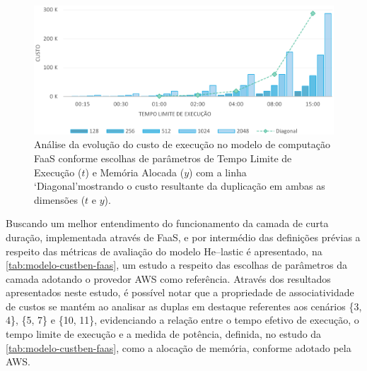 \documentclass[english,brazilian]{UNISINOSmonografia} %
\begin{document}
\begin{figure}[tb]
	\centering%
	\begin{minipage}{\textwidth}
		\caption[Análise da evolução do custo de execução no modelo de computação FaaS conforme escolhas de parâmetros de Tempo Limite de Execução ($t$) e Memória Alocada ($y$).]{Análise da evolução do custo de execução no modelo de computação FaaS conforme escolhas de parâmetros de Tempo Limite de Execução ($t$) e Memória Alocada ($y$) com a linha \textquoteleft Diagonal\textquoteright mostrando o custo resultante da duplicação em ambas as dimensões ($ t $ e $ y $).}
		\label{fig:modelo-custben-faas}
		\vspace{1ex}
		\includegraphics[width=\textwidth]{modelo-custben-faas}
	\end{minipage}
\end{figure}


Buscando um melhor entendimento do funcionamento da camada de curta duração, implementada através de FaaS, e por intermédio das definições prévias a respeito das métricas de avaliação do modelo \textsf{He}--lastic é apresentado, na \autoref{tab:modelo-custben-faas}, um estudo a respeito das escolhas de parâmetros da camada adotando o provedor AWS como referência.
Através dos resultados apresentados neste estudo, é possível notar que a propriedade de associatividade de custos se mantém ao analisar as duplas em destaque referentes aos cenários \{3, 4\}, \{5, 7\} e \{10, 11\}, evidenciando a relação entre o tempo efetivo de execução, o tempo limite de execução e a medida de potência, definida, no estudo da \autoref{tab:modelo-custben-faas}, como a alocação de memória, conforme adotado pela AWS.
\end{document}
